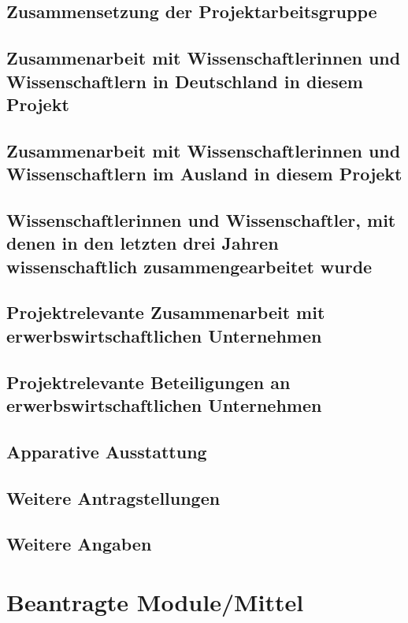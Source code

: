 \documentclass{scrartcl}
\begin{document}
\subsection{Zusammensetzung der Projektarbeitsgruppe}

\subsection{Zusammenarbeit mit Wissenschaftlerinnen und Wissenschaftlern in Deutschland in diesem Projekt}

\subsection{Zusammenarbeit mit Wissenschaftlerinnen und Wissenschaftlern im Ausland in diesem Projekt}

\subsection{Wissenschaftlerinnen und Wissenschaftler, mit denen in den letzten drei Jahren wissenschaftlich zusammengearbeitet wurde}

\subsection{Projektrelevante Zusammenarbeit mit erwerbswirtschaftlichen Unternehmen}

\subsection{Projektrelevante Beteiligungen an erwerbswirtschaftlichen Unternehmen}

\subsection{Apparative Ausstattung}

\subsection{Weitere Antragstellungen}

\subsection{Weitere Angaben}


\section{Beantragte Module/Mittel}
\end{document}

